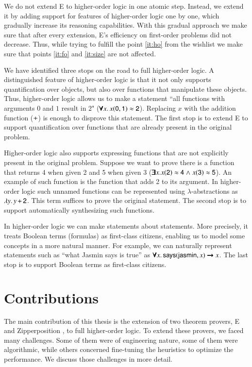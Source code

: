 We do not extend E to higher-order logic in one atomic step. Instead, we extend
it by adding support for features of higher-order logic one by one,
which gradually increase its reasoning capabilities. With this gradual
approach we make sure that after every extension, E's
efficiency on first-order problems did not decrease. Thus, while trying
to fulfill the point \ref{it:ho} from the wishlist we make sure that points
\ref{it:fo} and \ref{it:size} are not affected.

We have identified three stops on the road to full higher-order logic. A
distinguished feature of higher-order logic is that it not only supports
quantification over objects, but also over functions that manipulate these
objects. Thus, higher-order logic allows us to make a statement ``all functions
with arguments $0$ and $1$ result in $2$" ($\pmb{\forall} x. \,  x (\mathsf{0}, \mathsf{1}) \approx
\mathsf{2}$). Replacing $x$ with the addition function ($\mathsf{+}$) is enough to
disprove this statement. The first stop is to extend E to support
quantification over functions that are already present in the original problem.

Higher-order logic also supports expressing functions that are not explicitly
present in the original problem. Suppose we want to prove there is a
function that returns 4 when given 2 and 5 when given 3 ($\pmb{\exists} x. x(\mathsf{2})
\approx \mathsf{4} \mathrel\land x (\mathsf{3}) \approx \mathsf{5} $). An example of such function is
the function that adds 2 to its argument. In higher-order logic such unnamed
functions can be represented using $\lambda$-abstractions as $\lambda y.\, y \,
\mathsf{+} \, \mathsf{2}$. This term suffices to prove the original statement. The
second stop is to support automatically synthesizing such functions.

In higher-order logic we can make statements about statements. More precisely,
it treats Boolean terms (formulas) as first-class citizens, enabling us to
model some concepts in a more natural manner. For example, we can naturally
represent statements such as ``what Jasmin says is true'' as $\pmb{\forall} x. \,
\mathsf{says}(\mathsf{jasmin}, x) \pmb{\rightarrow} x$. The last stop is to support Boolean terms
as first-class citizens.
\pagebreak[2]

\section{Contributions}

The main contribution of this thesis is the extension of two theorem provers,
E and Zipperposition \cite{sc-15-simon-phd}, to full higher-order logic. To
extend these provers, we faced many challenges. Some of them were of engineering
nature, some of them were algorithmic, while others concerned fine-tuning the
heuristics to optimize the performance. We discuss those challenges in more detail.

